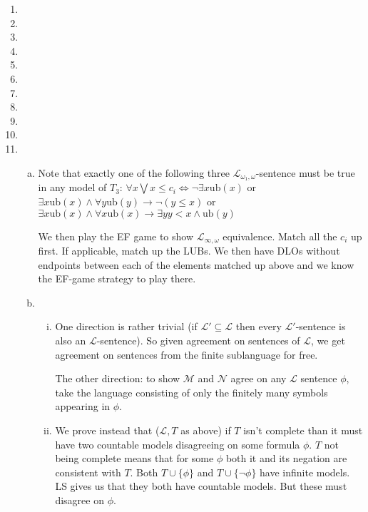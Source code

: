 \documentclass[10pt]{article}
\newcommand{\A}{\forall}
\newcommand{\mcM}{\mathcal{M}}
\newcommand{\mcN}{\mathcal{N}}
\newcommand{\mcL}{\mathcal{L}}
\newcommand{\E}{\exists}
\begin{document}
\begin{enumerate}[1.]
\begin{enumerate}[a)]
  \end{enumerate}
 
\item
 
\item
 
\item

\item
 
\item
 
\item
 
\item
 
\item

\item
 
\item
 
\item
  \begin{enumerate}[a)]

    \item Note that exactly one of the following three \(\mcL_{\omega_1, \omega}\)-sentence must be true in any model of \(T_3\): 
    \(\A x \bigvee x \leq c_i \iff \neg\E x \text{ub}(x)\) or
    \(\E x \text{ub}(x) \land \A y \text{ub}(y) \to \neg(y \leq x)\) or
    \(\E x \text{ub}(x) \land \A x \text{ub}(x) \to \E y y < x \land \text{ub}(y)\)

    We then play the EF game to show \(\mcL_{\infty, \omega}\) equivalence. Match all the \(c_i\) up first. If applicable, match up the LUBs.
    We then have DLOs without endpoints between each of the elements matched up above and we know the EF-game strategy to play there.   
    
    \item
      \begin{enumerate}[i)]
        \item One direction is rather trivial (if \(\mcL' \subseteq \mcL\) then every \(\mcL'\)-sentence is also an \(\mcL\)-sentence). So given agreement on sentences of \(\mcL\), we get agreement on sentences from the finite sublanguage for free.

The other direction: to show \(\mcM\) and \(\mcN\) agree on any \(\mcL\) sentence \(\phi\), take the language consisting of only the finitely many symbols appearing in \(\phi\). 

        \item We prove instead that (\(\mcL, T\) as above) if \(T\) isn't complete than it must have two countable models disagreeing on some formula \(\phi\). \(T\) not being complete means that for some \(\phi\) both it and its negation are consistent with \(T\). Both \(T \cup \{\phi\}\) and \(T \cup \{\neg \phi\}\) have infinite models. LS gives us that they both have countable models. But these must disagree on \(\phi\). 


\end{enumerate}
\end{enumerate}
\end{enumerate}
\end{document}
